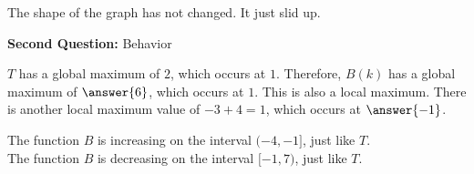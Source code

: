 \documentclass{ximera}
\begin{document}
The shape of the graph has not changed.  It just slid up.



\textbf{\textcolor{purple!85!blue}{Second Question:}}  Behavior


$T$ has a global maximum of $2$, which occurs at $1$.  Therefore, $B(k)$ has a global maximum of $\answer{6}$, which occurs at $1$.  This is also a local maximum.  There is another local maximum value of $-3+4=1$, which occurs at $\answer{-1}$.

The function $B$ is increasing on the interval $(-4,-1]$, just like $T$. \\
The function $B$ is decreasing on the interval $[-1, 7)$, just like $T$.
\end{document}
